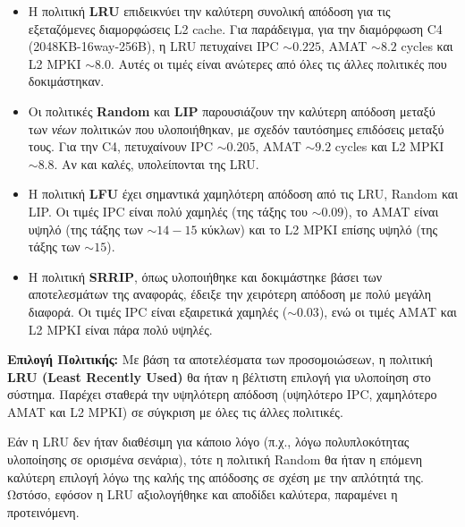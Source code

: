 \documentclass{article}
\begin{document}
\begin{itemize}
    \item Η πολιτική \textbf{LRU} επιδεικνύει την καλύτερη συνολική απόδοση για τις εξεταζόμενες διαμορφώσεις L2 cache. Για παράδειγμα, για την διαμόρφωση C4 (2048KB-16way-256B), η LRU πετυχαίνει IPC $\sim 0.225$, AMAT $\sim 8.2$ cycles και L2 MPKI $\sim 8.0$. Αυτές οι τιμές είναι ανώτερες από όλες τις άλλες πολιτικές που δοκιμάστηκαν.
    \item Οι πολιτικές \textbf{Random} και \textbf{LIP} παρουσιάζουν την καλύτερη απόδοση μεταξύ των \textit{νέων} πολιτικών που υλοποιήθηκαν, με σχεδόν ταυτόσημες επιδόσεις μεταξύ τους. Για την C4, πετυχαίνουν IPC $\sim 0.205$, AMAT $\sim 9.2$ cycles και L2 MPKI $\sim 8.8$. Αν και καλές, υπολείπονται της LRU.
    \item Η πολιτική \textbf{LFU} έχει σημαντικά χαμηλότερη απόδοση από τις LRU, Random και LIP. Οι τιμές IPC είναι πολύ χαμηλές (της τάξης του $\sim 0.09$), το AMAT είναι υψηλό (της τάξης των $\sim 14-15$ κύκλων) και το L2 MPKI επίσης υψηλό (της τάξης των $\sim 15$).
    \item Η πολιτική \textbf{SRRIP}, όπως υλοποιήθηκε και δοκιμάστηκε βάσει των αποτελεσμάτων της αναφοράς, έδειξε την χειρότερη απόδοση με πολύ μεγάλη διαφορά. Οι τιμές IPC είναι εξαιρετικά χαμηλές ($\sim 0.03$), ενώ οι τιμές AMAT και L2 MPKI είναι πάρα πολύ υψηλές.
\end{itemize}

\textbf{Επιλογή Πολιτικής:}
Με βάση τα αποτελέσματα των προσομοιώσεων, η πολιτική \textbf{LRU (Least Recently Used)} θα ήταν η βέλτιστη επιλογή για υλοποίηση στο σύστημα. 
Παρέχει σταθερά την υψηλότερη απόδοση (υψηλότερο IPC, χαμηλότερο AMAT και L2 MPKI) σε σύγκριση με όλες τις άλλες πολιτικές.

Εάν η LRU δεν ήταν διαθέσιμη για κάποιο λόγο (π.χ., λόγω πολυπλοκότητας υλοποίησης σε ορισμένα σενάρια), τότε η πολιτική Random θα ήταν η επόμενη καλύτερη επιλογή λόγω της καλής της απόδοσης σε σχέση με την απλότητά της. 
Ωστόσο, εφόσον η LRU αξιολογήθηκε και αποδίδει καλύτερα, παραμένει η προτεινόμενη.
\end{document}

